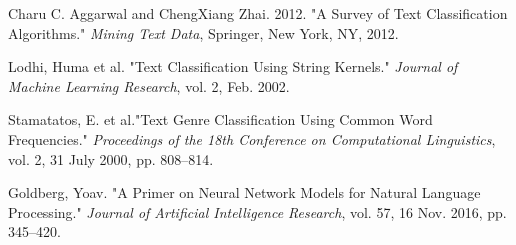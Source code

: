 \documentclass[11pt,letterpaper]{article}
\begin{document}
\pagebreak
\begin{thebibliography}{9}
\item Charu C. Aggarwal and ChengXiang Zhai. 2012. "A Survey of Text Classification Algorithms." \textit{Mining Text Data}, Springer, New York, NY, 2012. \\

\item Lodhi, Huma et al. "Text Classification Using String Kernels." \textit{Journal of Machine Learning Research}, vol. 2, Feb. 2002.\\

\item Stamatatos, E. et al."Text Genre Classification Using Common Word Frequencies." \textit{Proceedings of the 18th Conference on Computational Linguistics}, vol. 2, 31 July 2000, pp. 808–814.\\

\item Goldberg, Yoav. "A Primer on Neural Network Models for Natural Language Processing." \textit{Journal of Artificial Intelligence Research}, vol. 57, 16 Nov. 2016, pp. 345–420.
\end{thebibliography}
\end{document}
